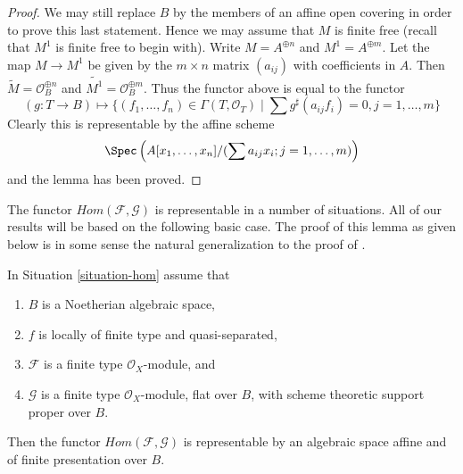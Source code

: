 \begin{proof}
\medskip\noindent
We may still replace $B$ by the members of an affine open covering
in order to prove this last statement. Hence we may assume that $M$
is finite free (recall that $M^1$ is finite free to begin with).
Write $M = A^{\oplus n}$ and $M^1 = A^{\oplus m}$. Let the map
$M \to M^1$ be given by the $m \times n$ matrix $(a_{ij})$ with
coefficients in $A$. Then $\widetilde{M} = \mathcal{O}_B^{\oplus n}$
and $\widetilde{M^1} = \mathcal{O}_B^{\oplus m}$. Thus the functor
above is equal to the functor
$$
(g : T \to B) \longmapsto
\{(f_1, \ldots, f_n) \in \Gamma(T, \mathcal{O}_T) \mid
\sum g^\sharp(a_{ij}f_i) = 0, j = 1, \ldots, m\}
$$
Clearly this is representable by the affine scheme
$$
\Spec\left(A[x_1, \ldots, x_n]/(\sum a_{ij}x_i; j = 1, \ldots, m)\right)
$$
and the lemma has been proved.
\end{proof}

\noindent
The functor $\mathit{Hom}(\mathcal{F}, \mathcal{G})$ is representable in a
number of situations. All of our results will be based on the following
basic case. The proof of this lemma as given below is in some sense the
natural generalization to the proof of \cite[III, Cor 7.7.8]{EGA}.

\begin{lemma}
\label{lemma-noetherian-hom}
In Situation \ref{situation-hom} assume that
\begin{enumerate}
\item $B$ is a Noetherian algebraic space,
\item $f$ is locally of finite type and quasi-separated,
\item $\mathcal{F}$ is a finite type $\mathcal{O}_X$-module, and
\item $\mathcal{G}$ is a finite type $\mathcal{O}_X$-module, flat over $B$,
with scheme theoretic support proper over $B$.
\end{enumerate}
Then the functor $\mathit{Hom}(\mathcal{F}, \mathcal{G})$ is
representable by an algebraic space affine and of finite presentation
over $B$.
\end{lemma}

